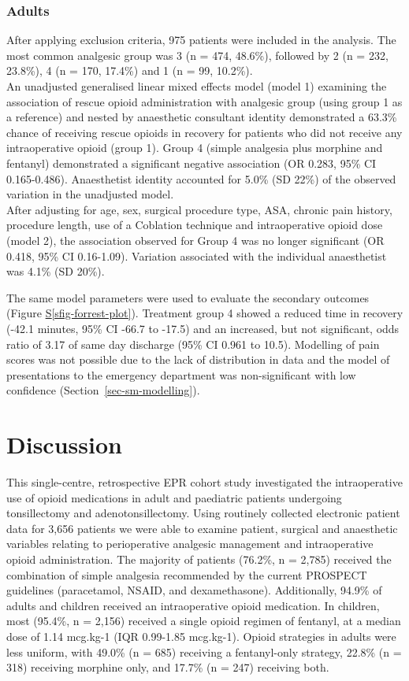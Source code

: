 \documentclass[
  letterpaper,
  DIV=11,
  numbers=noendperiod]{scrreprt}
\newcommand*\quartosfigref[1]{Figure \hyperref[#1]{S\ref{#1}}}
\begin{document}
\subsubsection{Adults}\label{adults}

After applying exclusion criteria, 975 patients were included in the
analysis. The most common analgesic group was 3 (n = 474, 48.6\%),
followed by 2 (n = 232, 23.8\%), 4 (n = 170, 17.4\%) and 1 (n = 99,
10.2\%).\\
An unadjusted generalised linear mixed effects model (model 1) examining
the association of rescue opioid administration with analgesic group
(using group 1 as a reference) and nested by anaesthetic consultant
identity demonstrated a 63.3\% chance of receiving rescue opioids in
recovery for patients who did not receive any intraoperative opioid
(group 1). Group 4 (simple analgesia plus morphine and fentanyl)
demonstrated a significant negative association (OR 0.283, 95\% CI
0.165-0.486). Anaesthetist identity accounted for 5.0\% (SD 22\%) of the
observed variation in the unadjusted model.\\
After adjusting for age, sex, surgical procedure type, ASA, chronic pain
history, procedure length, use of a Coblation technique and
intraoperative opioid dose (model 2), the association observed for Group
4 was no longer significant (OR 0.418, 95\% CI 0.16-1.09). Variation
associated with the individual anaesthetist was 4.1\% (SD 20\%).

The same model parameters were used to evaluate the secondary outcomes
(\quartosfigref{sfig-forrest-plot}). Treatment group 4 showed a reduced
time in recovery (-42.1 minutes, 95\% CI -66.7 to -17.5) and an
increased, but not significant, odds ratio of 3.17 of same day discharge
(95\% CI 0.961 to 10.5). Modelling of pain scores was not possible due
to the lack of distribution in data and the model of presentations to
the emergency department was non-significant with low confidence
(Section~\ref{sec-sm-modelling}).

\section{Discussion}\label{discussion}

This single-centre, retrospective EPR cohort study investigated the
intraoperative use of opioid medications in adult and paediatric
patients undergoing tonsillectomy and adenotonsillectomy. Using
routinely collected electronic patient data for 3,656 patients we were
able to examine patient, surgical and anaesthetic variables relating to
perioperative analgesic management and intraoperative opioid
administration. The majority of patients (76.2\%, n = 2,785) received
the combination of simple analgesia recommended by the current PROSPECT
guidelines (paracetamol, NSAID, and dexamethasone). Additionally, 94.9\%
of adults and children received an intraoperative opioid medication. In
children, most (95.4\%, n = 2,156) received a single opioid regimen of
fentanyl, at a median dose of 1.14 mcg.kg-1 (IQR 0.99-1.85 mcg.kg-1).
Opioid strategies in adults were less uniform, with 49.0\% (n = 685)
receiving a fentanyl-only strategy, 22.8\% (n = 318) receiving morphine
only, and 17.7\% (n = 247) receiving both.
\end{document}
